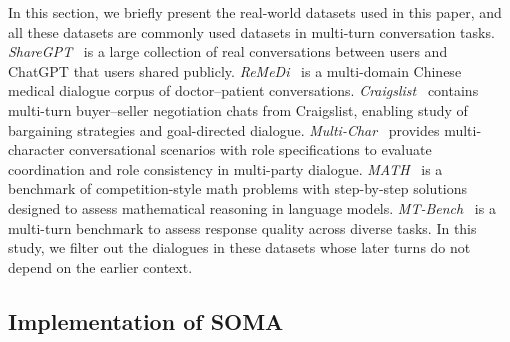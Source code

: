 In this section, we briefly present the real-world datasets used in this paper, and all these datasets are commonly used datasets in multi-turn conversation tasks. \textit{ShareGPT}~\citep{sharegpt} is a large collection of real conversations between users and ChatGPT that users shared publicly. \textit{ReMeDi}~\citep{yan2022remedi} is a multi-domain Chinese medical dialogue corpus of doctor–patient conversations. \textit{Craigslist}~\citep{he2018decoupling} contains multi-turn buyer–seller negotiation chats from Craigslist, enabling study of bargaining strategies and goal-directed dialogue. \textit{Multi-Char}~\citep{agentlans_multi-character_dialogue_2024} provides multi-character conversational scenarios with role specifications to evaluate coordination and role consistency in multi-party dialogue. \textit{MATH}~\citep{hendrycks2021measuring} is a benchmark of competition-style math problems with step-by-step solutions designed to assess mathematical reasoning in language models. \textit{MT-Bench}~\citep{zheng2023judging} is a multi-turn benchmark to assess response quality across diverse tasks. In this study, we filter out the dialogues in these datasets whose later turns do not depend on the earlier context. 

\subsection{Implementation of SOMA}\label{sec:app_implementation}

